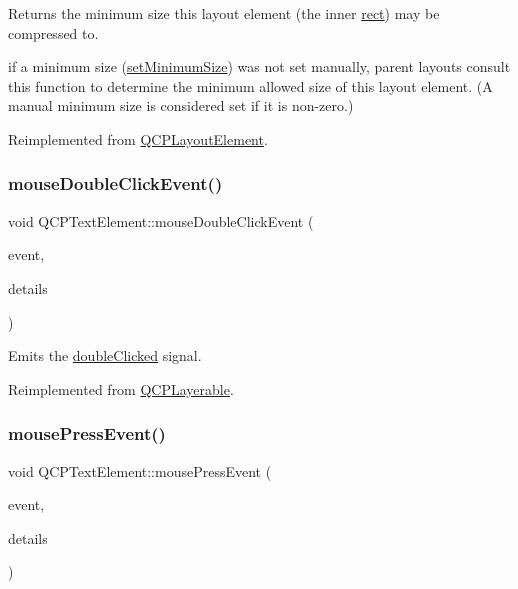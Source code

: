 Returns the minimum size this layout element (the inner \mbox{\hyperlink{class_q_c_p_layout_element_a208effccfe2cca4a0eaf9393e60f2dd4}{rect}}) may be compressed to.

if a minimum size (\mbox{\hyperlink{class_q_c_p_layout_element_a5dd29a3c8bc88440c97c06b67be7886b}{set\+Minimum\+Size}}) was not set manually, parent layouts consult this function to determine the minimum allowed size of this layout element. (A manual minimum size is considered set if it is non-\/zero.) 

Reimplemented from \mbox{\hyperlink{class_q_c_p_layout_element_ab3fdb5c9a5189bb2dac10d4d25329cd8}{Q\+C\+P\+Layout\+Element}}.

\mbox{\label{class_q_c_p_text_element_a2272ff775ab385f612e9fd39773de7c0}} 
\subsubsection{\texorpdfstring{mouse\+Double\+Click\+Event()}{mouseDoubleClickEvent()}}
{\footnotesize\ttfamily void Q\+C\+P\+Text\+Element\+::mouse\+Double\+Click\+Event (\begin{DoxyParamCaption}\item[{Q\+Mouse\+Event $\ast$}]{event,  }\item[{const Q\+Variant \&}]{details }\end{DoxyParamCaption})\hspace{0.3cm}{\ttfamily [virtual]}}

Emits the \mbox{\hyperlink{class_q_c_p_text_element_a9c6fd27ae8a7c3a02df7a6bbd3509e40}{double\+Clicked}} signal.

Reimplemented from \mbox{\hyperlink{class_q_c_p_layerable_a4171e2e823aca242dd0279f00ed2de81}{Q\+C\+P\+Layerable}}.

\mbox{\label{class_q_c_p_text_element_ad7b2c98355e3d2f912574b74fcee0574}} 
\subsubsection{\texorpdfstring{mouse\+Press\+Event()}{mousePressEvent()}}
{\footnotesize\ttfamily void Q\+C\+P\+Text\+Element\+::mouse\+Press\+Event (\begin{DoxyParamCaption}\item[{Q\+Mouse\+Event $\ast$}]{event,  }\item[{const Q\+Variant \&}]{details }\end{DoxyParamCaption})\hspace{0.3cm}{\ttfamily [virtual]}}

